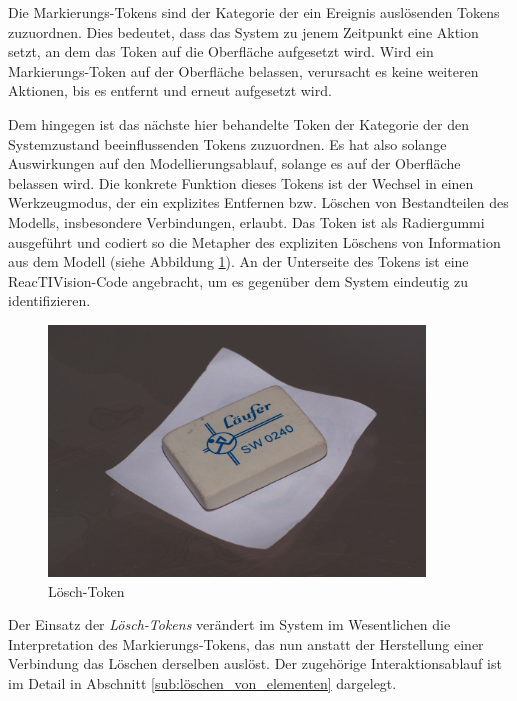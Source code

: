 Die Markierungs-Tokens sind der Kategorie der ein Ereignis auslösenden Tokens zuzuordnen. Dies bedeutet, dass das System zu jenem Zeitpunkt eine Aktion setzt, an dem das Token auf die Oberfläche aufgesetzt wird. Wird ein Markierungs-Token auf der Oberfläche belassen, verursacht es keine weiteren Aktionen, bis es entfernt und erneut aufgesetzt wird.

Dem hingegen ist das nächste hier behandelte Token der Kategorie der den Systemzustand beeinflussenden Tokens zuzuordnen. Es hat also solange Auswirkungen auf den Modellierungsablauf, solange es auf der Oberfläche belassen wird. Die konkrete Funktion dieses Tokens ist der Wechsel in einen Werkzeugmodus, der ein explizites Entfernen bzw. Löschen von Bestandteilen des Modells, insbesondere Verbindungen, erlaubt. Das Token ist als Radiergummi ausgeführt und codiert so die Metapher des expliziten Löschens von Information aus dem Modell (siehe Abbildung \ref{fig:img_SystemNeu_Loeschtoken}). An der Unterseite des Tokens ist eine ReacTIVision-Code angebracht, um es gegenüber dem System eindeutig zu identifizieren.

\begin{figure}[htbp]
	\centering
		\includegraphics[width=10cm]{img/SystemNeu/Loeschtoken.jpg}
	\caption{Lösch-Token}
	\label{fig:img_SystemNeu_Loeschtoken}
\end{figure}


Der Einsatz der \emph{Lösch-Tokens} verändert im System im Wesentlichen die Interpretation des Markierungs-Tokens, das nun anstatt der Herstellung einer Verbindung das Löschen derselben auslöst. Der  zugehörige Interaktionsablauf ist im Detail in Abschnitt \ref{sub:löschen_von_elementen} dargelegt.

